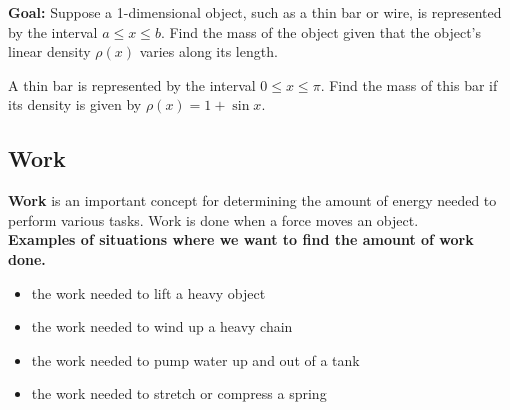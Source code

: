 \documentclass[12pt]{article}
\begin{document}
\textbf{Goal:} Suppose a 1-dimensional object, such as a thin bar or wire, is represented by the interval $a\leq x\leq b$. Find the mass of the object given that the object's linear density $\rho(x)$ varies along its length.

\newpage

\Example A thin bar is represented by the interval $0\leq x\leq\pi$. Find the mass of this bar if its density is given by $\rho(x)=1+\sin x$.

\vspace{100mm}

\subsection*{Work}

\textbf{Work} is an important concept for determining the amount of energy needed to perform various tasks. Work is done when a force moves an object.\\

\textbf{Examples of situations where we want to find the amount of work done.}
\begin{itemize}
\item the work needed to lift a heavy object
\item the work needed to wind up a heavy chain
\item the work needed to pump water up and out of a tank
\item the work needed to stretch or compress a spring
\end{itemize}
\end{document}
